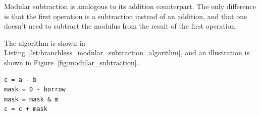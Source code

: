 \documentclass[10pt, a4paper]{report}
\begin{document}
Modular subtraction is analogous to its addition counterpart.
The only difference is that the first operation is a subtraction instead of
an addition, and that one doesn't need to subtract the modulus from the result
of the first operation.

The algorithm is shown in
Listing~\ref{lst:branchless_modular_subtraction_algorithm}, and an illustration
is shown in Figure~\ref{fig:modular_subtraction}.

\begin{lstlisting}
c = a - b
mask = 0 - borrow
mask = mask & m
c = c + mask
\end{lstlisting}




%
%
%
\end{document}
